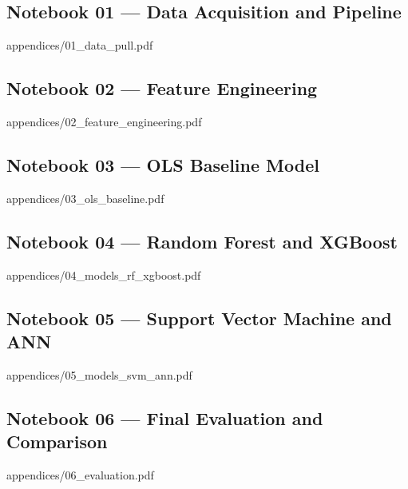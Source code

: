\documentclass[12pt]{article}
\begin{document}
\subsection{Notebook 01 — Data Acquisition and Pipeline}
%
           {appendices/01_data_pull.pdf}

\subsection{Notebook 02 — Feature Engineering}
%
           {appendices/02_feature_engineering.pdf}

\subsection{Notebook 03 — OLS Baseline Model}
%
           {appendices/03_ols_baseline.pdf}

\subsection{Notebook 04 — Random Forest and XGBoost}
%
           {appendices/04_models_rf_xgboost.pdf}

\subsection{Notebook 05 — Support Vector Machine and ANN}
%
           {appendices/05_models_svm_ann.pdf}

\subsection{Notebook 06 — Final Evaluation and Comparison}
%
           {appendices/06_evaluation.pdf}
\end{document}
